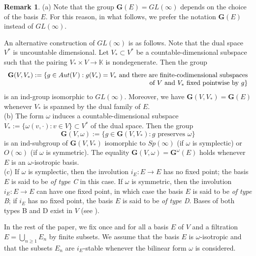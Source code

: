 \documentclass[12pt]{amsart}
\theoremstyle{definition}
\newtheorem{remark}{Remark}
\begin{document}
\begin{remark}
\label{remark-1-new}
{\rm (a)}
Note that the group $\mathbf{G}(E)=GL(\infty)$ depends on the choice of the basis $E$. For this reason, in what follows, we prefer the notation $\mathbf{G}(E)$ instead of $GL(\infty)$.

An alternative construction of $GL(\infty)$ is as follows. Note that the dual space $V^*$ is uncountable dimensional. Let $V_*\subset V^*$ be a countable-dimensional subspace such that the pairing $V_*\times V\to\mathbb{K}$ is nondegenerate. Then the group
\[
\begin{array}[t]{r}\mathbf{G}(V,V_*):=\{g\in Aut(V):g(V_*)=V_*\ \mbox{and there are finite-codimensional subspaces} \\ \mbox{of $V$ and $V_*$ fixed pointwise by $g$}\}
\end{array}
\]
is an ind-group isomorphic to $GL(\infty)$. Moreover, we have $\mathbf{G}(V,V_*)=\mathbf{G}(E)$ whenever $V_*$ is spanned by the dual family of $E$. \\
{\rm (b)} The form $\omega$ induces a countable-dimensional subspace $V_*:=\{\omega(v,\cdot):v\in V\}\subset V^*$ of the dual space.
Then the group
\[\mathbf{G}(V,\omega):=\{g\in \mathbf{G}(V,V_*):\mbox{$g$ preserves $\omega$}\}\]
is an ind-subgroup of $\mathbf{G}(V,V_*)$ isomorphic to $Sp(\infty)$ (if $\omega$ is symplectic) or $O(\infty)$ (if $\omega$ is symmetric).
The equality $\mathbf{G}(V,\omega)=\mathbf{G}^\omega(E)$ holds whenever $E$ is an $\omega$-isotropic basis. \\
{\rm (c)} If $\omega$ is symplectic, then the involution $i_E:E\to E$ has no fixed point; the basis $E$ is said to be {\em of type C} in this case. If $\omega$ is symmetric, then the involution $i_E:E\to E$ can have one fixed point, in which case the basis $E$ is said to be {\em of type B}; if $i_E$ has no fixed point,  the basis $E$ is said to be {\em of type D}. Bases of both types B and D exist in $V$ (see \cite[Lemma 4.2]{DP}).
\end{remark}


In the rest of the paper, we fix once and for all a basis $E$ of $V$ and a filtration $E=\bigcup_{n\geq 1}E_n$ by finite subsets. We assume that the basis $E$ is $\omega$-isotropic and that the subsets $E_n$ are $i_E$-stable
whenever the bilinear form $\omega$ is considered.
\end{document}
